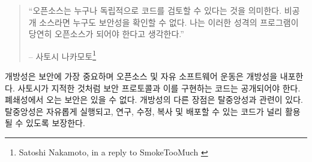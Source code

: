 \begin{quotation}\begin{samepage}
	\begin{comment}
		\enquote{Being open source means anyone can independently review the code. If
			it was closed source, nobody could verify the security. I think it's
			essential for a program of this nature to be open source.}
		\begin{flushright} -- Satoshi Nakamoto\footnote{Satoshi Nakamoto, in a reply to SmokeTooMuch \cite{satoshi-open-source}}
		\end{comment}
		\enquote{오픈소스는 누구나 독립적으로 코드를 검토할 수 있다는 것을 의미한다.
			비공개 소스라면 누구도 보안성을 확인할 수 없다. 
			나는 이러한 성격의 프로그램이 당연히 오픈소스가 되어야 한다고 생각한다.}
		\begin{flushright} -- 사토시 나카모토\footnote{Satoshi Nakamoto, in a reply to SmokeTooMuch \cite{satoshi-open-source}}
\end{flushright}\end{samepage}\end{quotation}
	
\begin{comment}
	Openness is paramount to security and inherent in open source and the
	free software movement. As Satoshi pointed out, secure protocols and the
	code which implements them have to be open --- there is no security
	through obscurity. Another benefit is again related to decentralization:
	code which can be run, studied, modified, copied, and distributed freely
	ensures that it is spread far and wide.
\end{comment}
개방성은 보안에 가장 중요하며 오픈소스 및 자유 소프트웨어 운동은 개방성을 내포한다.
사토시가 지적한 것처럼 보안 프로토콜과 이를 구현하는 코드는 공개되어야 한다.
폐쇄성에서 오는 보안은 있을 수 없다.
개방성의 다른 장점은 탈중앙성과 관련이 있다.
탈중앙성은 자유롭게 실행되고, 연구, 수정, 복사 및 배포할 수 있는 코드가 널리 활용될 수 있도록 보장한다.
	
